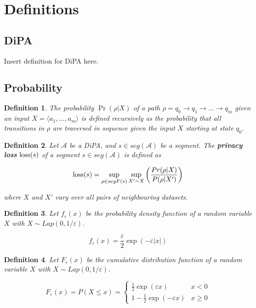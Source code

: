 \documentclass{article}
\newtheorem{definition}{Definition}[section]
\renewcommand{\epsilon}{\varepsilon}
\newcommand{\loss}{\textup{loss}}
\newcommand{\1}{\langle 1 \rangle}
\newcommand{\2}{\langle 2 \rangle}
\begin{document}
\section{Definitions}

\subsection{DiPA}

Insert definition for DiPA here. 

\subsection{Probability}

\begin{definition}
    The probability $\Pr(\rho | X)$ of a path $\rho = q_0 \to q_1 \to \dots \to q_m$ given an input $X = \langle a_1 , \dots, a_m \rangle$ is defined recursively as the probability that all transitions in $\rho$ are traversed in sequence given the input $X$ starting at state $q_0$.
\end{definition}

\begin{definition}
    Let $\mathcal{A}$ be a DiPA, and $s \in seg(\mathcal{A})$ be a segment. The \textbf{privacy loss} $\loss(s)$ of a segment $s \in seg(\mathcal{A})$ is defined as 

    \[\loss(s) = \sup_{\rho \in segF(s)}\sup_{X' \sim X} \left(\frac{Pr(\rho | X)}{P(\rho | X')} \right) \]

    where $X$ and $X'$ vary over all pairs of neighbouring datasets. 
\end{definition}

\begin{definition}
    Let $f_\epsilon(x)$ be the probability density function of a random variable $X$ with $X \sim Lap(0, 1/\epsilon)$. 

    \[f_\epsilon(x) = \frac{\epsilon}{2} \exp(-\epsilon |x|)\]
\end{definition}

\begin{definition}
    Let $F_\epsilon(x)$ be the cumulative distribution function of a random variable $X$ with $X \sim Lap(0, 1/\epsilon)$.

    \[F_\epsilon(x) = P(X \leq x) = \begin{cases}
        \frac{1}{2} \exp(\epsilon x) & x < 0 \\
        1 - \frac{1}{2} \exp(-\epsilon x) & x \geq 0
    \end{cases}\]
\end{definition}
\end{document}
